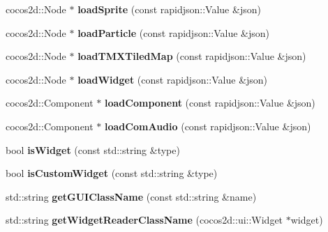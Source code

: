 \begin{DoxyCompactItemize}
\item 
\mbox{\label{classCSLoader_a696a497e26076f21c2bc3161773c0eea}} 
cocos2d\+::\+Node $\ast$ {\bfseries load\+Sprite} (const rapidjson\+::\+Value \&json)
\item 
\mbox{\label{classCSLoader_af89044df47f18e9e9967bfeb54763acd}} 
cocos2d\+::\+Node $\ast$ {\bfseries load\+Particle} (const rapidjson\+::\+Value \&json)
\item 
\mbox{\label{classCSLoader_a0e060df23e2ad2d14771fb28219cca12}} 
cocos2d\+::\+Node $\ast$ {\bfseries load\+T\+M\+X\+Tiled\+Map} (const rapidjson\+::\+Value \&json)
\item 
\mbox{\label{classCSLoader_a4a23fd2beb3dd9e6900a9438656d0a0e}} 
cocos2d\+::\+Node $\ast$ {\bfseries load\+Widget} (const rapidjson\+::\+Value \&json)
\item 
\mbox{\label{classCSLoader_a47d9190872b7d78252bc330e6b6c95d3}} 
cocos2d\+::\+Component $\ast$ {\bfseries load\+Component} (const rapidjson\+::\+Value \&json)
\item 
\mbox{\label{classCSLoader_a0307370327fece08dc04fba63ed2427e}} 
cocos2d\+::\+Component $\ast$ {\bfseries load\+Com\+Audio} (const rapidjson\+::\+Value \&json)
\item 
\mbox{\label{classCSLoader_a975912d570a40efb0883ab54c6267e76}} 
bool {\bfseries is\+Widget} (const std\+::string \&type)
\item 
\mbox{\label{classCSLoader_a85ed19243431e55d734eee16ac0c1769}} 
bool {\bfseries is\+Custom\+Widget} (const std\+::string \&type)
\item 
\mbox{\label{classCSLoader_ace50f878e093d8f46577c09eae7c37c4}} 
std\+::string {\bfseries get\+G\+U\+I\+Class\+Name} (const std\+::string \&name)
\item 
\mbox{\label{classCSLoader_a84eb609f499347cb41226fc22bd087fc}} 
std\+::string {\bfseries get\+Widget\+Reader\+Class\+Name} (cocos2d\+::ui\+::\+Widget $\ast$widget)
\item 

\end{DoxyCompactItemize}
